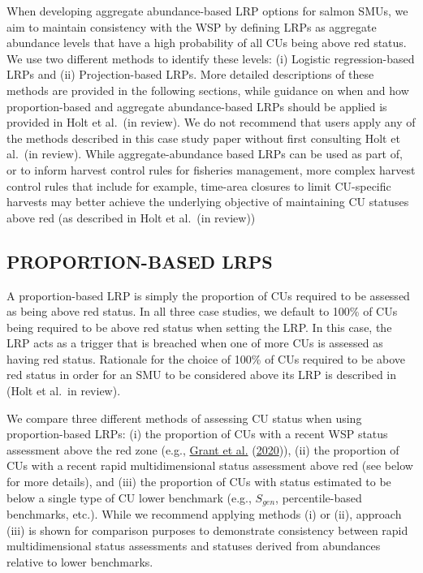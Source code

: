 \documentclass[11pt]{book}
\begin{document}
When developing aggregate abundance-based LRP options for salmon SMUs, we aim to maintain consistency with the WSP by defining LRPs as aggregate abundance levels that have a high probability of all CUs being above red status. We use two different methods to identify these levels: (i) Logistic regression-based LRPs and (ii) Projection-based LRPs. More detailed descriptions of these methods are provided in the following sections, while guidance on when and how proportion-based and aggregate abundance-based LRPs should be applied is provided in Holt et al.~(in review). We do not recommend that users apply any of the methods described in this case study paper without first consulting Holt et al.~(in review). While aggregate-abundance based LRPs can be used as part of, or to inform harvest control rules for fisheries management, more complex harvest control rules that include for example, time-area closures to limit CU-specific harvests may better achieve the underlying objective of maintaining CU statuses above red (as described in Holt et al.~(in review))

\hypertarget{proportion-based-lrps}{%
\subsection{PROPORTION-BASED LRPS}\label{proportion-based-lrps}}

A proportion-based LRP is simply the proportion of CUs required to be assessed as being above red status. In all three case studies, we default to 100\% of CUs being required to be above red status when setting the LRP. In this case, the LRP acts as a trigger that is breached when one of more CUs is assessed as having red status. Rationale for the choice of 100\% of CUs required to be above red status in order for an SMU to be considered above its LRP is described in (Holt et al.~in review).

We compare three different methods of assessing CU status when using proportion-based LRPs: (i) the proportion of CUs with a recent WSP status assessment above the red zone (e.g., \protect\hyperlink{ref-grant2017FraserSockeye2020}{Grant et al.} (\protect\hyperlink{ref-grant2017FraserSockeye2020}{2020})), (ii) the proportion of CUs with a recent rapid multidimensional status assessment above red (see below for more details), and (iii) the proportion of CUs with status estimated to be below a single type of CU lower benchmark (e.g., \(S_{gen}\), percentile-based benchmarks, etc.). While we recommend applying methods (i) or (ii), approach (iii) is shown for comparison purposes to demonstrate consistency between rapid multidimensional status assessments and statuses derived from abundances relative to lower benchmarks.
\end{document}
